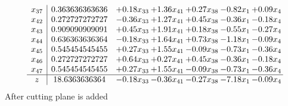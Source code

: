 \documentclass[8pt]{article}
\begin{document}
\[\begin{array}{c| c c@{\hskip 2pt} c@{\hskip 2pt} c@{\hskip 2pt} c@{\hskip 2pt} c@{\hskip 2pt} }
 x_{37}   &  0.363636363636 & +  0.18 x_{33} & +  1.36 x_{41} & +  0.27 x_{38} & -0.82 x_{1} & +  0.09 x_{4}\\
 x_{42}   &  0.272727272727 & -0.36 x_{33} & +  1.27 x_{41} & +  0.45 x_{38} & -0.36 x_{1} & -0.18 x_{4}\\
 x_{43}   &  0.909090909091 & +  0.45 x_{33} & +  1.91 x_{41} & +  0.18 x_{38} & -0.55 x_{1} & -0.27 x_{4}\\
 x_{44}   &  0.636363636364 & -0.18 x_{33} & +  1.64 x_{41} & +  0.73 x_{38} & -1.18 x_{1} & -0.09 x_{4}\\
 x_{45}   &  0.545454545455 & +  0.27 x_{33} & +  1.55 x_{41} & -0.09 x_{38} & -0.73 x_{1} & -0.36 x_{4}\\
 x_{46}   &  0.272727272727 & +  0.64 x_{33} & +  0.27 x_{41} & +  0.45 x_{38} & -0.36 x_{1} & -0.18 x_{4}\\
 x_{47}   &  0.545454545455 & +  0.27 x_{33} & +  1.55 x_{41} & -0.09 x_{38} & -0.73 x_{1} & -0.36 x_{4}\\
\hline
z    &  18.6363636364 & -0.18 x_{33} & -0.36 x_{41} & -0.27 x_{38} & -7.18 x_{1} & -0.09 x_{4}\\
\end{array}\]
 After cutting plane is added 
\end{document}
